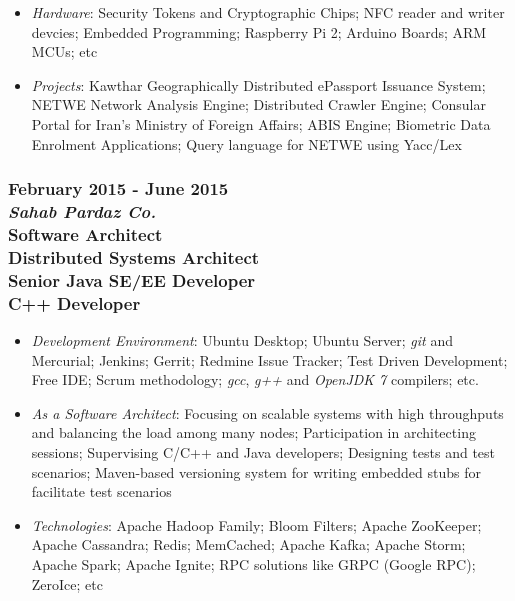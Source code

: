 \documentclass[10pt,a4paper]{article}
\begin{document}
\begin{itemize}
    \item \small \textit {Hardware}: Security Tokens and Cryptographic Chips; NFC reader and writer devcies; Embedded Programming; Raspberry Pi 2; Arduino Boards; ARM MCUs; etc
    \item \small \textit {Projects}: Kawthar Geographically Distributed ePassport Issuance System; NETWE Network Analysis Engine; Distributed Crawler Engine; Consular Portal for Iran's Ministry of Foreign Affairs; ABIS Engine; Biometric Data Enrolment Applications; Query language for NETWE using Yacc/Lex
  \end{itemize}
  \setlength{\leftskip}{0pt}
  \setlength{\rightskip}{0cm}
	  
\subsubsection{{February 2015 - June 2015} \\ \textnormal {\textit {Sahab Pardaz Co.}} \\ {Software Architect \\ Distributed Systems Architect \\ Senior Java SE/EE Developer \\ C++ Developer}}
	\setlength{\leftskip}{0.5cm}
  \setlength{\rightskip}{1cm}
  \begin{itemize}
    \setlength{\rightskip}{1cm}
    \setlength\itemsep{0em}
    \item \small \textit {Development Environment}: Ubuntu Desktop; Ubuntu Server; \textit{git} and Mercurial; Jenkins; Gerrit; Redmine Issue Tracker; Test Driven Development; Free IDE; Scrum methodology; \textit{gcc}, \textit{g++} and \textit{OpenJDK 7} compilers; etc.
    \item \small \textit {As a Software Architect}: Focusing on scalable systems with high throughputs and balancing the load among many nodes; Participation in architecting sessions; Supervising C/C++ and Java developers; Designing tests and test scenarios; Maven-based versioning system for writing embedded stubs for facilitate test scenarios
    \item \small \textit {Technologies}: Apache Hadoop Family; Bloom Filters; Apache ZooKeeper; Apache Cassandra; Redis; MemCached; Apache Kafka; Apache Storm; Apache Spark; Apache Ignite; RPC solutions like GRPC (Google RPC); ZeroIce; etc
  \end{itemize}
  \setlength{\leftskip}{0pt}
  \setlength{\rightskip}{0cm}
	  
\end{document}
